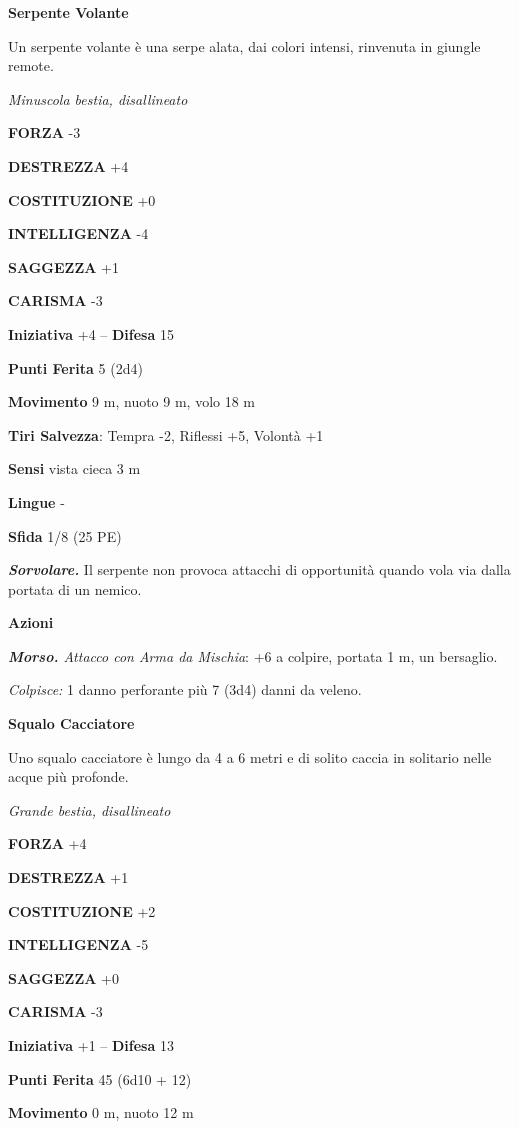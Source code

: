 \begin{multicols}{2}
\medskip\textbf{Serpente Volante}

Un serpente volante è una serpe alata, dai colori intensi, rinvenuta in giungle remote.

\emph{Minuscola bestia, disallineato}

\textbf{FORZA} -3

\textbf{DESTREZZA} +4

\textbf{COSTITUZIONE} +0

\textbf{INTELLIGENZA} -4

\textbf{SAGGEZZA} +1

\textbf{CARISMA} -3

\textbf{Iniziativa} +4 -- \textbf{Difesa} 15

\textbf{Punti Ferita} 5 (2d4)

\textbf{Movimento} 9 m, nuoto 9 m, volo 18 m

\textbf{Tiri Salvezza}: Tempra -2, Riflessi +5, Volontà +1

\textbf{Sensi} vista cieca 3 m

\textbf{Lingue} -

\textbf{Sfida} 1/8 (25 PE)

\emph{\textbf{Sorvolare.}} Il serpente non provoca attacchi di opportunità quando vola via dalla portata di un nemico.

\textbf{Azioni}

\emph{\textbf{Morso.} Attacco con Arma da Mischia}: +6 a colpire, portata 1 m, un bersaglio.

\emph{Colpisce:} 1 danno perforante più 7 (3d4) danni da veleno.

\medskip\textbf{Squalo Cacciatore}

Uno squalo cacciatore è lungo da 4 a 6 metri e di solito caccia in solitario nelle acque più profonde.

\emph{Grande bestia, disallineato}

\textbf{FORZA} +4

\textbf{DESTREZZA} +1

\textbf{COSTITUZIONE} +2

\textbf{INTELLIGENZA} -5

\textbf{SAGGEZZA} +0

\textbf{CARISMA} -3

\textbf{Iniziativa} +1 -- \textbf{Difesa} 13

\textbf{Punti Ferita} 45 (6d10 + 12)

\textbf{Movimento} 0 m, nuoto 12 m


\end{multicols}
